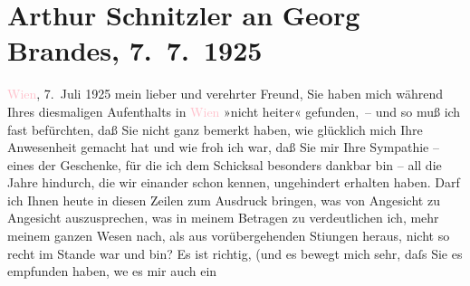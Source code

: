 

               \section[Arthur Schnitzler an Georg Brandes, 7. 7. 1925]{ Arthur Schnitzler an Georg Brandes, 7. 7. 1925}\nopagebreak{}\rehead{ }\normalsize\beginnumbering{} \toendnotes[C]{\smallbreak\pagebreak[2]} 
\toendnotes[C]{\smallbreak}\pstart
           \raggedleft{}{\pb}\textcolor{pink}{Wien}{}\ledrightnote{\textcolor{pink}{Wien}}, 7. Juli 1925\pend
           \pstart
           mein lieber und verehrter Freund, Sie haben mich während Ihres
               diesmaligen Aufenthalts in \textcolor{pink}{Wien}{}\ledrightnote{\textcolor{pink}{Wien}} »nicht heiter«
               gefunden, – und so muß ich fast befürchten, daß Sie nicht ganz bemerkt haben, wie
               glücklich mich Ihre Anwesenheit gemacht hat und wie froh ich war, daß Sie mir Ihre
               Sympathie – eines der Geschenke, für die ich dem Schicksal besonders dankbar bin –
               all die Jahre hindurch, die wir einander schon kennen, ungehindert erhalten haben.
               Darf ich Ihnen heute in diesen Zeilen zum Ausdruck bringen, was von Angesicht zu
               Angesicht auszusprechen, was in meinem Betragen zu verdeutlichen ich, mehr meinem
               ganzen Wesen nach, als aus vorübergehenden Sti{\geminationm}ungen
               heraus, nicht so recht im Stande war und bin? Es ist richtig, (und es bewegt mich
               sehr, daſs Sie es empfunden haben, we{\geminationn} es mir auch ein
